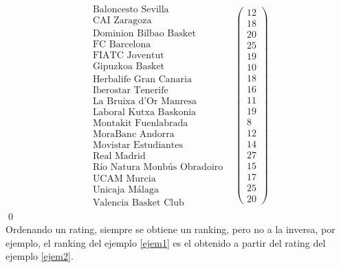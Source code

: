 	\[
	\begin{array}{ccc}
	\begin{array}{c}
	\text{Baloncesto Sevilla}\\
	\text{CAI Zaragoza} \\
	\text{Dominion Bilbao Basket} \\
	\text{FC Barcelona} \\
	\text{FIATC Joventut} \\
	\text{Gipuzkoa Basket} \\
	\text{Herbalife Gran Canaria} \\
	\text{Iberostar Tenerife} \\
	\text{La Bruixa d'Or Manresa} \\
	\text{Laboral Kutxa Baskonia} \\
	\text{Montakit Fuenlabrada} \\
	\text{MoraBanc Andorra} \\
	\text{Movistar Estudiantes} \\
	\text{Real Madrid} \\
	\text{Río Natura Monbús Obradoiro} \\
	\text{UCAM Murcia} \\
	\text{Unicaja Málaga} \\
	\text{Valencia Basket Club}
	
	\end{array} & \left(\begin{array}{c}
	12\\
	18\\
	20\\
	25\\
	19\\
	10\\
	18\\
	16\\
	11\\
	19\\
	8\\
	12\\
	14\\
	27\\
	15\\
	17\\
	25\\
	20
	\end{array} \right)
	\end{array}  
	\]
\qed
\ \\

Ordenando un rating, siempre se obtiene un ranking, pero no a la inversa, por ejemplo, el ranking del ejemplo \ref{ejem1} es el obtenido a partir del rating del ejemplo \ref{ejem2}.

